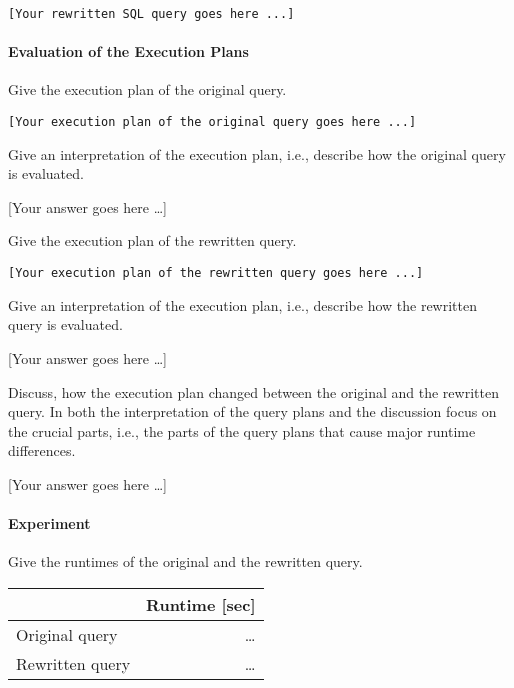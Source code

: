 \documentclass[11pt]{scrartcl}
\newcommand{\youranswerhere}{[Your answer goes here \ldots]}
\begin{document}
    \begin{lstlisting}[style=dbtsql]
[Your rewritten SQL query goes here ...]
    \end{lstlisting}

    \paragraph{Evaluation of the Execution Plans}

    Give the execution plan of the original query.

            {\small
    \parskip0pt\begin{verbatim}
[Your execution plan of the original query goes here ...]
    \end{verbatim}}

    Give an interpretation of the execution plan, i.e., describe how the original query is evaluated.

    \youranswerhere{}

    Give the execution plan of the rewritten query.

            {\small
    \parskip0pt\begin{verbatim}
[Your execution plan of the rewritten query goes here ...]
    \end{verbatim}}

    Give an interpretation of the execution plan, i.e., describe how the rewritten query is evaluated.

    \youranswerhere{}

    Discuss, how the execution plan changed between the original and the rewritten query. In both the interpretation of the query plans and the discussion focus on the crucial parts, i.e., the parts of the query plans that cause major runtime differences.

    \youranswerhere{}

    \paragraph{Experiment}

    Give the runtimes of the original and the rewritten query.

    \begin{table}[H]
        \centering
        \begin{tabular}{l|r}
            & Runtime [sec] \tabularnewline
            \hline
            Original query & \ldots \tabularnewline
            Rewritten query & \ldots \tabularnewline
        \end{tabular}
    \end{table}
\end{document}

